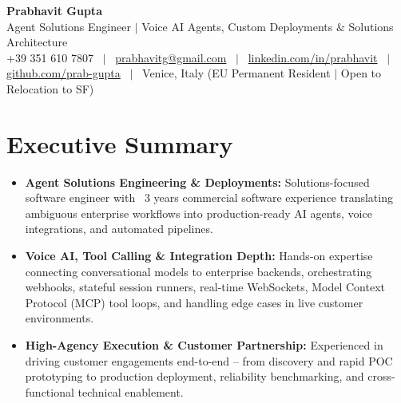 \documentclass[a4paper,10pt]{article}
\begin{document}
\begin{minipage}[c]{0.80\textwidth}
  {\Huge\bfseries Prabhavit Gupta}\\[3pt]
  {\color{accent}\large Agent Solutions Engineer $\vert$ Voice AI Agents, Custom Deployments $\&$ Solutions Architecture}\\[6pt]
  {\footnotesize +39 351 610 7807 ~$\vert$~
  \href{mailto:prabhavitg@gmail.com}{prabhavitg@gmail.com} ~$\vert$~
  \href{https://www.linkedin.com/in/prabhavit/}{linkedin.com/in/prabhavit} ~$\vert$~
  \href{https://github.com/prab-gupta}{github.com/prab-gupta} ~$\vert$~
  Venice, Italy (EU Permanent Resident $\vert$ Open to Relocation to SF)}
\end{minipage}\hfill

\vspace{6pt}

\section{Executive Summary}
\begin{itemize}
  \item \textbf{Agent Solutions Engineering \& Deployments:} Solutions-focused software engineer with ~3 years commercial software experience translating ambiguous enterprise workflows into production-ready AI agents, voice integrations, and automated pipelines.
  \item \textbf{Voice AI, Tool Calling \& Integration Depth:} Hands-on expertise connecting conversational models to enterprise backends, orchestrating webhooks, stateful session runners, real-time WebSockets, Model Context Protocol (MCP) tool loops, and handling edge cases in live customer environments.
  \item \textbf{High-Agency Execution \& Customer Partnership:} Experienced in driving customer engagements end-to-end -- from discovery and rapid POC prototyping to production deployment, reliability benchmarking, and cross-functional technical enablement.
\end{itemize}

\end{document}
